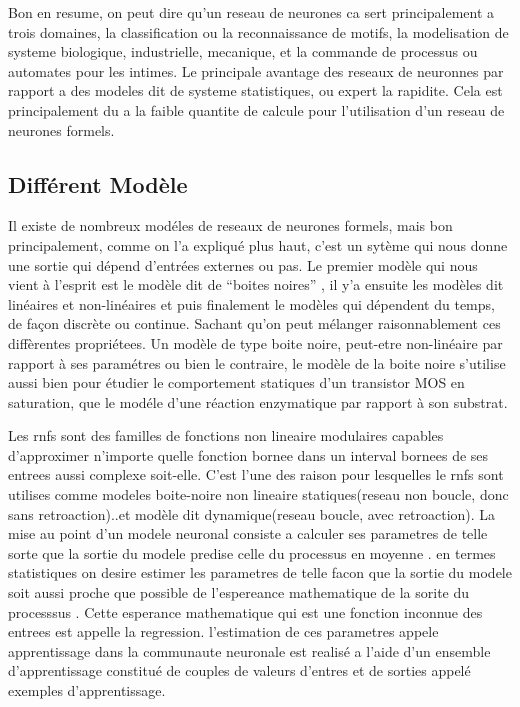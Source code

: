 \documentclass[a4paper,12pt]{report}
\begin{document}
Bon en resume, on peut dire qu'un reseau de neurones ca sert
principalement a trois domaines, la classification ou la
reconnaissance de motifs, la modelisation de systeme biologique,
industrielle, mecanique, et la commande de processus ou automates pour
les intimes. Le principale avantage des reseaux de neuronnes par
rapport a des modeles dit de systeme statistiques, ou expert la
rapidite. Cela est principalement du a la faible quantite de calcule
pour l'utilisation  d'un reseau de neurones formels.
\subsection{Diff\'erent Mod\`ele}

Il existe de nombreux mod\'eles de reseaux de neurones formels, mais
bon principalement, comme on l'a expliqu\'e plus haut, c'est un
syt\`eme qui nous donne une sortie qui d\'epend d'entr\'ees externes
ou pas. Le premier mod\`ele qui nous vient \`a l'esprit est le
mod\`ele dit de ``boites noires'' , il y'a ensuite les mod\`eles dit
lin\'eaires et non-lin\'eaires et puis finalement le mod\`eles qui
d\'ependent du temps, de fa\c con discr\`ete ou continue. Sachant
qu'on peut m\'elanger raisonnablement ces diff\`erentes propri\'etees.
Un mod\`ele de type boite noire, peut-etre non-lin\'eaire par rapport
\`a ses param\'etres ou bien le contraire, le mod\`ele de la boite
noire s'utilise aussi bien pour \'etudier le comportement statiques
d'un transistor MOS en saturation, que le mod\'ele d'une r\'eaction
enzymatique par rapport \`a son substrat.

Les rnfs sont des familles de fonctions non lineaire modulaires
capables d'approximer n'importe quelle fonction bornee dans un
interval bornees de ses entrees aussi complexe soit-elle. C'est l'une
des raison pour lesquelles le rnfs sont utilises comme modeles
boite-noire non lineaire statiques(reseau non boucle, donc sans
retroaction)..et mod\`ele dit dynamique(reseau boucle, avec
retroaction). La mise au point d'un modele neuronal consiste a
calculer ses parametres de telle sorte que la sortie du modele predise
celle du processus en moyenne . en termes statistiques on desire
estimer les parametres de telle facon que la sortie du modele soit
aussi proche que possible de l'espereance mathematique de la sorite
du processsus . Cette esperance mathematique qui est une fonction
inconnue des entrees est appelle la regression. l'estimation de
ces parametres appele apprentissage dans la communaute neuronale est
realis\'e  a l'aide d'un ensemble d'apprentissage constitu\'e de couples
de valeurs d'entres et de sorties appel\'e exemples d'apprentissage.
\end{document}
